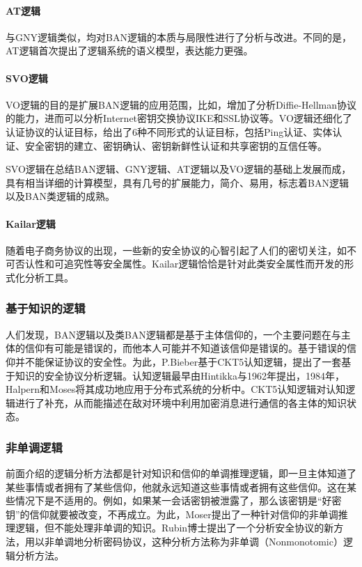 \documentclass[cs4size,a4pape,UTF8]{ctexart}
\numberwithin{equation}{section}
\numberwithin{table}{section}
\numberwithin{figure}{section}
\begin{document}
\paragraph{AT逻辑}
与GNY逻辑类似，均对BAN逻辑的本质与局限性进行了分析与改进。不同的是，AT逻辑首次提出了逻辑系统的语义模型，表达能力更强。

\paragraph{SVO逻辑}
VO逻辑的目的是扩展BAN逻辑的应用范围，比如，增加了分析Diffie-Hellman协议的能力，进而可以分析Internet密钥交换协议IKE和SSL协议等。VO逻辑还细化了认证协议的认证目标，给出了6种不同形式的认证目标，包括Ping认证、实体认证、安全密钥的建立、密钥确认、密钥新鲜性认证和共享密钥的互信任等。

SVO逻辑在总结BAN逻辑、GNY逻辑、AT逻辑以及VO逻辑的基础上发展而成，具有相当详细的计算模型，具有几号的扩展能力，简介、易用，标志着BAN逻辑以及BAN类逻辑的成熟。

\paragraph{Kailar逻辑}
随着电子商务协议的出现，一些新的安全协议的心智引起了人们的密切关注，如不可否认性和可追究性等安全属性。Kailar逻辑恰恰是针对此类安全属性而开发的形式化分析工具。

\subsubsection{基于知识的逻辑}

人们发现，BAN逻辑以及类BAN逻辑都是基于主体信仰的，一个主要问题在与主体的信仰有可能是错误的，而他本人可能并不知道该信仰是错误的。基于错误的信仰并不能保证协议的安全性。为此，P.Bieber基于CKT5认知逻辑，提出了一套基于知识的安全协议分析逻辑。认知逻辑最早由Hintikka与1962年提出，1984年，Halpern和Moses将其成功地应用于分布式系统的分析中。CKT5认知逻辑对认知逻辑进行了补充，从而能描述在敌对环境中利用加密消息进行通信的各主体的知识状态。

\subsubsection{非单调逻辑}

前面介绍的逻辑分析方法都是针对知识和信仰的单调推理逻辑，即一旦主体知道了某些事情或者拥有了某些信仰，他就永远知道这些事情或者拥有这些信仰。这在某些情况下是不适用的。例如，如果某一会话密钥被泄露了，那么该密钥是“好密钥”的信仰就要被改变，不再成立。为此，Moser提出了一种针对信仰的非单调推理逻辑，但不能处理非单调的知识。Rubin博士提出了一个分析安全协议的新方法，用以非单调地分析密码协议，这种分析方法称为非单调（Nonmonotomic）逻辑分析方法。
\end{document}
